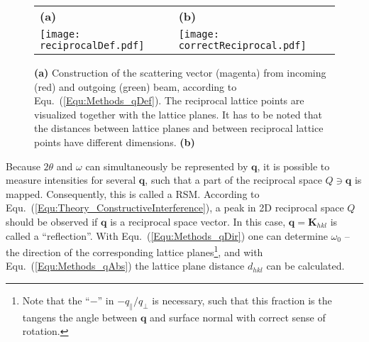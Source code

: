 \begin{figure}
    \centering
    \begin{tabular}{ll}
        \textbf{(a)}&\textbf{(b)}\\
        \texttt{[image: reciprocalDef.pdf]}
        &\texttt{[image: correctReciprocal.pdf]}
    \end{tabular}
    \caption{\textbf{(a)} Construction of the scattering vector (magenta) from incoming (red) and outgoing (green) beam, according to Equ.~(\ref{Equ:Methods_qDef}).
    The reciprocal lattice points are visualized together with the lattice planes.
    It has to be noted that the distances between lattice planes and between reciprocal lattice points have different dimensions.
    \textbf{(b)}}
    \label{Fig:Methods_qDef}
\end{figure} 
Because $2\theta$ and $\omega$ can simultaneously be represented by $\mathbf{q}$, it is possible to measure intensities for several $\mathbf{q}$, such that a part of the reciprocal space $Q\ni\mathbf{q}$ is mapped.
Consequently, this is called a \gls{RSM}.
According to Equ.~(\ref{Equ:Theory_ConstructiveInterference}), a peak in 2D reciprocal space $Q$ should be observed if $\mathbf{q}$ is a reciprocal space vector.
In this case, $\mathbf{q}=\mathbf{K}_{hkl}$ is called a \enquote{reflection}.
With Equ.~(\ref{Equ:Methods_qDir}) one can determine $\omega_0$ -- the direction of the corresponding lattice planes\footnote{
    Note that the \enquote{$-$} in $-q_\parallel/q_\perp$ is necessary, such that this fraction is the tangens the angle between $\mathbf{q}$ and surface normal with correct sense of rotation. 
}, and with Equ.~(\ref{Equ:Methods_qAbs}) the lattice plane distance $d_{hkl}$ can be calculated.

